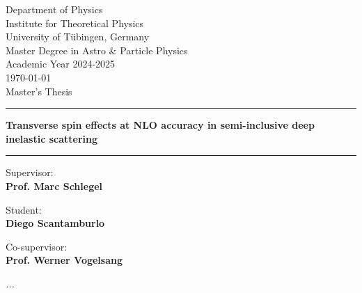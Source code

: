 
\thispagestyle{empty}
    
\begin{center}
   \vspace{1cm}
    \large{Department of Physics\\Institute for Theoretical Physics\\ University of Tübingen, Germany\\
   Master Degree in Astro \& Particle Physics\\
   Academic Year 2024-2025\\
   \today}\\
    \vspace*{1.5cm} 
    Master's Thesis
    \noindent\rule{\textwidth}{1pt}
   \noindent\textbf{\huge{Transverse spin effects at NLO accuracy in semi-inclusive deep inelastic scattering }}
   \rule{\textwidth}{1pt}
       
\end{center}

\vspace{20mm}

\noindent
\begin{minipage}[t]{0.45\textwidth} \raggedright 
{\Large Supervisor:\\ {\bf Prof. Marc Schlegel}}
\end{minipage}
\hfill
\begin{minipage}[t]{0.45\textwidth} \raggedleft
{\Large  Student: \\ {\bf Diego Scantamburlo}}
\end{minipage}
\vspace{5mm}

\noindent
\begin{minipage}[t]{0.55\textwidth}\raggedright 
{\Large Co-supervisor:\\ {\bf Prof. Werner Vogelsang}}
\end{minipage}

\vfill


\newpage
\textit{}
\newpage
\vspace{6cm}
\textit{...}
\newpage
\tableofcontents
\clearpage

\setcounter{page}{1} 
